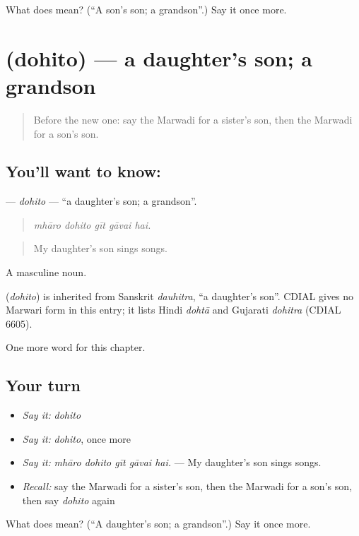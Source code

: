 \begin{tcolorbox}[breakable,colback=teal!4,colframe=teal!35!black,title={Before you move on}]
What does  mean? (\textquotedblleft{}A son's son; a grandson\textquotedblright{}.) Say it once more.
\end{tcolorbox}
\section[\texorpdfstring{\mw{दोहितो} (dohito)}{दोहितो (dohito)}]{ (dohito) — a daughter's son; a grandson}

\label{lesson:MW-C261-dohito}



\begin{quote}
Before the new one: say the Marwadi for a sister's son, then the Marwadi for a son's son.
\end{quote}

\subsection*{You'll want to know: }
\textbf{} — \emph{dohito} — \textquotedblleft{}a daughter's son; a grandson\textquotedblright{}.

\begin{quote}
    
\end{quote}

\begin{quote}
\emph{mhāro dohito gīt gāvai hai.}
\end{quote}

\begin{quote}
My daughter's son sings songs.
\end{quote}

A masculine noun.

\begin{cousinweb}
\textbf{} (\emph{dohito}) is inherited from Sanskrit \emph{dauhitra}, \textquotedblleft{}a daughter's son\textquotedblright{}. CDIAL gives no Marwari form in this entry; it lists Hindi \emph{dohtā} and Gujarati \emph{dohitra} (CDIAL 6605).
\end{cousinweb}

\begin{grammarlens}[title={What you've built}]
One more word for this chapter.
\end{grammarlens}

\subsection*{Your turn}
\begin{itemize}
\raggedright
  \item \emph{Say it:} \emph{dohito}
  \item \emph{Say it:} \emph{dohito}, once more
  \item \emph{Say it:} \emph{mhāro dohito gīt gāvai hai.} — My daughter's son sings songs.
  \item \emph{Recall:} say the Marwadi for a sister's son, then the Marwadi for a son's son, then say \emph{dohito} again
\end{itemize}

\begin{tcolorbox}[breakable,colback=teal!4,colframe=teal!35!black,title={Before you move on}]
What does  mean? (\textquotedblleft{}A daughter's son; a grandson\textquotedblright{}.) Say it once more.
\end{tcolorbox}
